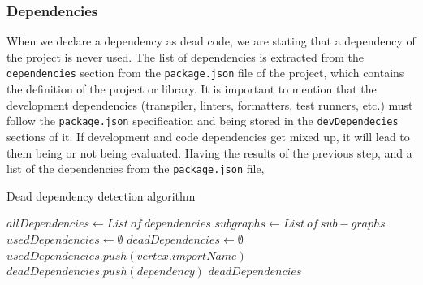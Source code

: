 \documentclass{uvamscse}
\begin{document}
\subsubsection{Dependencies}
When we declare a dependency as dead code, we are stating that a dependency of the project is never used. The list of dependencies is extracted from the \texttt{dependencies} section from the \texttt{package.json} file of the project, which contains the definition of the project or library. It is important to mention that the development dependencies (transpiler, linters, formatters, test runners, etc.) must follow the \texttt{package.json} specification and being stored in the \texttt{devDependecies} sections of it. If development and code dependencies get mixed up, it will lead to them being or not being evaluated. Having the results of the previous step, and a list of the dependencies from the \texttt{package.json} file, 
\begin{algorithm}[H]
\caption{Dead dependency detection algorithm}
\begin{algorithmic}[1]
\STATE {}
\STATE $allDependencies \gets List\ of\ dependencies$
\STATE $subgraphs \gets List\ of\ sub-graphs$
\STATE
\STATE {}
\STATE $usedDependencies \gets \emptyset$
\STATE $deadDependencies \gets \emptyset$
                \STATE $usedDependencies.push(vertex.importName)$
            \ENDIF
        \ENDFOR
    \ENDIF
\ENDFOR
{}
        \STATE $deadDependencies.push(dependency)$
    \ENDIF
\ENDFOR
\RETURN $deadDependencies$
\end{algorithmic}
\end{algorithm}
\end{document}
